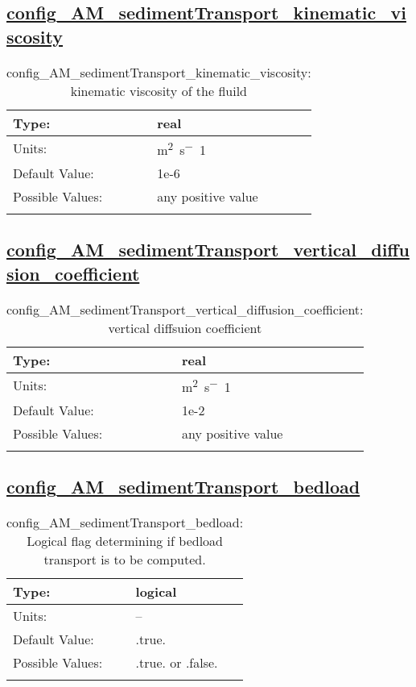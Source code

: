 \subsection[config\_AM\_sedimentTransport\_kinematic\_viscosity]{\hyperref[sec:nm_tab_AM_sedimentTransport]{config\_AM\_sedimentTransport\_kinematic\_viscosity}}
\label{subsec:nm_sec_config_AM_sedimentTransport_kinematic_viscosity}
\begin{center}
\begin{longtable}{| p{2.0in} || p{4.0in} |}
    \hline
    Type: & real \\
    \hline
    Units: & \si{m^2.s^-1} \\
    \hline
    Default Value: & 1e-6 \\
    \hline
    Possible Values: & any positive value \\
    \hline
    \caption{config\_AM\_sedimentTransport\_kinematic\_viscosity: kinematic viscosity of the fluild}
\end{longtable}
\end{center}
\subsection[config\_AM\_sedimentTransport\_vertical\_diffusion\_coefficient]{\hyperref[sec:nm_tab_AM_sedimentTransport]{config\_AM\_sedimentTransport\_vertical\_diffusion\_coefficient}}
\label{subsec:nm_sec_config_AM_sedimentTransport_vertical_diffusion_coefficient}
\begin{center}
\begin{longtable}{| p{2.0in} || p{4.0in} |}
    \hline
    Type: & real \\
    \hline
    Units: & \si{m^2.s^-1} \\
    \hline
    Default Value: & 1e-2 \\
    \hline
    Possible Values: & any positive value \\
    \hline
    \caption{config\_AM\_sedimentTransport\_vertical\_diffusion\_coefficient: vertical diffsuion coefficient}
\end{longtable}
\end{center}
\subsection[config\_AM\_sedimentTransport\_bedload]{\hyperref[sec:nm_tab_AM_sedimentTransport]{config\_AM\_sedimentTransport\_bedload}}
\label{subsec:nm_sec_config_AM_sedimentTransport_bedload}
\begin{center}
\begin{longtable}{| p{2.0in} || p{4.0in} |}
    \hline
    Type: & logical \\
    \hline
    Units: & -- \\
    \hline
    Default Value: & .true. \\
    \hline
    Possible Values: & .true. or .false. \\
    \hline
    \caption{config\_AM\_sedimentTransport\_bedload: Logical flag determining if bedload transport is to be computed.}
\end{longtable}
\end{center}
